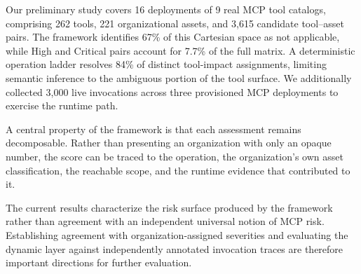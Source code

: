 \documentclass[sigconf]{acmart}
\begin{document}
Our preliminary study covers 16 deployments of 9 real MCP tool catalogs,
comprising 262 tools, 221 organizational assets, and 3,615 candidate
tool--asset pairs. The framework identifies 67\% of this Cartesian space as
not applicable, while High and Critical pairs account for 7.7\% of the full
matrix. A deterministic operation ladder resolves 84\% of distinct tool-impact
assignments, limiting semantic inference to the ambiguous portion of the tool
surface. We additionally collected 3,000 live invocations across three
provisioned MCP deployments to exercise the runtime path.

A central property of the framework is that each assessment remains
decomposable. Rather than presenting an organization with only an opaque
number, the score can be traced to the operation, the organization's own
asset classification, the reachable scope, and the runtime evidence that
contributed to it.

The current results characterize the risk surface produced by the framework
rather than agreement with an independent universal notion of MCP risk.
Establishing agreement with organization-assigned severities and evaluating
the dynamic layer against independently annotated invocation traces are
therefore important directions for further evaluation.


\balance


\end{document}
